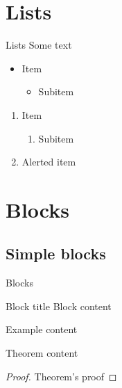 {
    \frame{\titlepage}
}

\section{Lists}
\begin{frame}{Lists}
    Some text
    \begin{itemize}
        \item Item
        \begin{itemize}
            \item Subitem
        \end{itemize}
    \end{itemize}
    \begin{enumerate}
        \item Item
        \begin{enumerate}
            \item Subitem
        \end{enumerate}
        \item \alert{Alerted item}
    \end{enumerate}
\end{frame}

\section{Blocks}
\subsection{Simple blocks}
\begin{frame}{Blocks}
    \begin{block}{Block title}
        Block content
    \end{block}
    \begin{example}
        Example content
    \end{example}
    \begin{theorem}
        Theorem content
    \end{theorem}
    \begin{proof}
        Theorem's proof
    \end{proof}
\end{frame}

